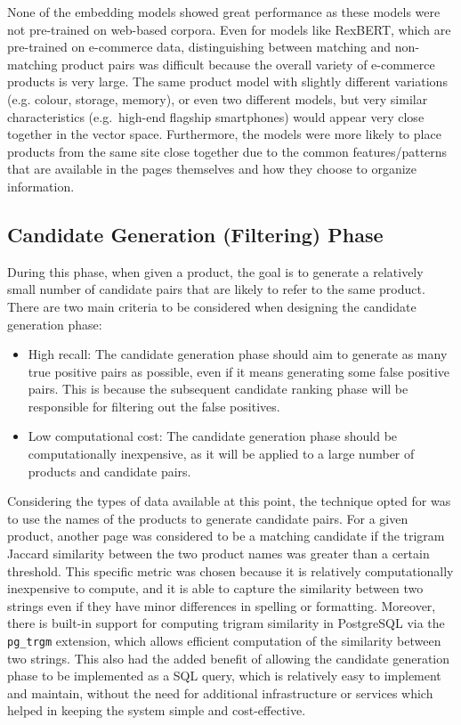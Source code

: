 None of the embedding models showed great performance as these models were not pre-trained on web-based corpora.
Even for models like RexBERT, which are pre-trained on e-commerce data, distinguishing between matching and non-matching product pairs was difficult because the overall variety of e-commerce products is very large.
The same product model with slightly different variations (e.g. colour, storage, memory), or even two different models, but very similar characteristics (e.g.\ high-end flagship smartphones) would appear very close together in the vector space.
Furthermore, the models were more likely to place products from the same site close together due to the common features/patterns that are available in the pages themselves and how they choose to organize information.

\subsection{Candidate Generation (Filtering) Phase}\label{subsec:sec_product_matching_filtering_phase}
During this phase, when given a product, the goal is to generate a relatively small number of candidate pairs that are likely to refer to the same product.
There are two main criteria to be considered when designing the candidate generation phase:
\begin{itemize}
    \item High recall: The candidate generation phase should aim to generate as many true positive pairs as possible, even if it means generating some false positive pairs.
    This is because the subsequent candidate ranking phase will be responsible for filtering out the false positives.
    \item Low computational cost: The candidate generation phase should be computationally inexpensive, as it will be applied to a large number of products and candidate pairs.
\end{itemize}

Considering the types of data available at this point, the technique opted for was to use the names of the products to generate candidate pairs.
For a given product, another page was considered to be a matching candidate if the trigram Jaccard similarity between the two product names was greater than a certain threshold.
This specific metric was chosen because it is relatively computationally inexpensive to compute, and it is able to capture the similarity between two strings even if they have minor differences in spelling or formatting.
Moreover, there is built-in support for computing trigram similarity in PostgreSQL via the \texttt{pg\_trgm} extension, which allows efficient computation of the similarity between two strings.
This also had the added benefit of allowing the candidate generation phase to be implemented as a SQL query, which is relatively easy to implement and maintain, without the need for additional infrastructure or services which helped in keeping the system simple and cost-effective.

